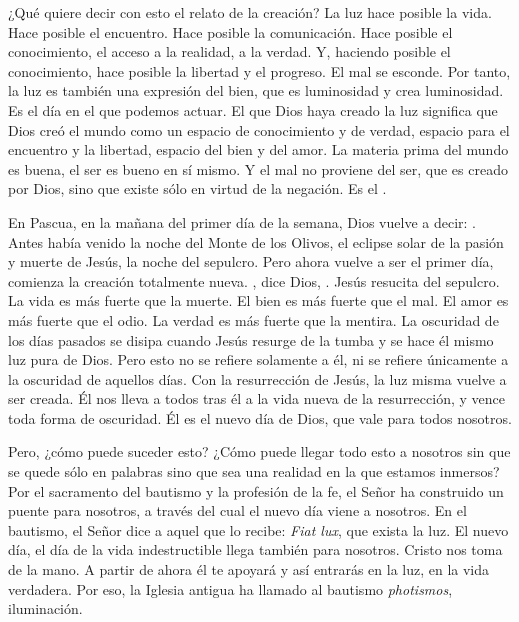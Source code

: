 \begin{body}
¿Qué quiere decir con esto el relato de la creación? La luz hace posible la vida. Hace posible el encuentro. Hace posible la comunicación. Hace posible el conocimiento, el acceso a la realidad, a la verdad. Y, haciendo posible el conocimiento, hace posible la libertad y el progreso. El mal se esconde. Por tanto, la luz es también una expresión del bien, que es luminosidad y crea luminosidad. Es el día en el que podemos actuar. El que Dios haya creado la luz significa que Dios creó el mundo como un espacio de conocimiento y de verdad, espacio para el encuentro y la libertad, espacio del bien y del amor. La materia prima del mundo es buena, el ser es bueno en sí mismo. Y el mal no proviene del ser, que es creado por Dios, sino que existe sólo en virtud de la negación. Es el .

En Pascua, en la mañana del primer día de la semana, Dios vuelve a decir: . Antes había venido la noche del Monte de los Olivos, el eclipse solar de la pasión y muerte de Jesús, la noche del sepulcro. Pero ahora vuelve a ser el primer día, comienza la creación totalmente nueva. , dice Dios, . Jesús resucita del sepulcro. La vida es más fuerte que la muerte. El bien es más fuerte que el mal. El amor es más fuerte que el odio. La verdad es más fuerte que la mentira. La oscuridad de los días pasados se disipa cuando Jesús resurge de la tumba y se hace él mismo luz pura de Dios. Pero esto no se refiere solamente a él, ni se refiere únicamente a la oscuridad de aquellos días. Con la resurrección de Jesús, la luz misma vuelve a ser creada. Él nos lleva a todos tras él a la vida nueva de la resurrección, y vence toda forma de oscuridad. Él es el nuevo día de Dios, que vale para todos nosotros.

Pero, ¿cómo puede suceder esto? ¿Cómo puede llegar todo esto a nosotros sin que se quede sólo en palabras sino que sea una realidad en la que estamos inmersos? Por el sacramento del bautismo y la profesión de la fe, el Señor ha construido un puente para nosotros, a través del cual el nuevo día viene a nosotros. En el bautismo, el Señor dice a aquel que lo recibe: \textit{Fiat lux}, que exista la luz. El nuevo día, el día de la vida indestructible llega también para nosotros. Cristo nos toma de la mano. A partir de ahora él te apoyará y así entrarás en la luz, en la vida verdadera. Por eso, la Iglesia antigua ha llamado al bautismo \textit{photismos}, iluminación.


\end{body}
